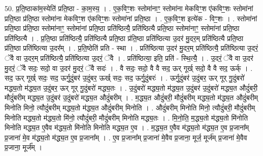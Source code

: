 \documentclass[17pt]{extarticle}
\begin{document}
50. प्र॒ति॒ष्ठाका॑म॒स्येति॑ प्रति॒ष्ठा - का॒म॒स्य॒ । . ए॒क॒विꣳ॒॒शः स्तोमा॑नाꣳ॒॒ स्तोमा॑ना मेकविꣳ॒॒श ए॑कविꣳ॒॒शः स्तोमा॑नां प्रति॒ष्ठा प्र॑ति॒ष्ठा स्तोमा॑ना मेकविꣳ॒॒श ए॑कविꣳ॒॒शः स्तोमा॑नां प्रति॒ष्ठा । . ए॒क॒विꣳ॒॒श इत्ये॑क - विꣳ॒॒शः । . स्तोमा॑नां प्रति॒ष्ठा प्र॑ति॒ष्ठा स्तोमा॑नाꣳ॒॒ स्तोमा॑नां प्रति॒ष्ठा प्रति॑ष्ठित्यै॒ प्रति॑ष्ठित्यै प्रति॒ष्ठा स्तोमा॑नाꣳ॒॒ स्तोमा॑नां प्रति॒ष्ठा प्रति॑ष्ठित्यै । . प्र॒ति॒ष्ठा प्रति॑ष्ठित्यै॒ प्रति॑ष्ठित्यै प्रति॒ष्ठा प्र॑ति॒ष्ठा प्रति॑ष्ठित्या उ॒दर॑ मु॒दर॒म् प्रति॑ष्ठित्यै प्रति॒ष्ठा प्र॑ति॒ष्ठा प्रति॑ष्ठित्या उ॒दर᳚म् । . प्र॒ति॒ष्ठेति॑ प्रति - स्था । . प्रति॑ष्ठित्या उ॒दर॑ मु॒दर॒म् प्रति॑ष्ठित्यै॒ प्रति॑ष्ठित्या उ॒दरं॒ ॅवै वा उ॒दर॒म् प्रति॑ष्ठित्यै॒ प्रति॑ष्ठित्या उ॒दरं॒ ॅवै । . प्रति॑ष्ठित्या॒ इति॒ प्रति॑ - स्थि॒त्यै॒ । . उ॒दरं॒ ॅवै वा उ॒दर॑ मु॒दरं॒ ॅवै सदः॒ सदो॒ वा उ॒दर॑ मु॒दरं॒ ॅवै सदः॑ । . वै सदः॒ सदो॒ वै वै सद॒ ऊर् गूर्ख् सदो॒ वै वै सद॒ ऊर्क् । . सद॒ ऊर् गूर्ख् सदः॒ सद॒ ऊर्गु॒दुंबर॑ उ॒दुंबर॒ ऊर्ख् सदः॒ सद॒ ऊर्गु॒दुंबरः॑ । . ऊर्गु॒दुंबर॑ उ॒दुंबर॒ ऊर् गूर् गु॒दुंबरो॑ मद्ध्य॒तो म॑द्ध्य॒त उ॒दुंबर॒ ऊर् गूर् गु॒दुंबरो॑ मद्ध्य॒तः । . उ॒दुंबरो॑ मद्ध्य॒तो म॑द्ध्य॒त उ॒दुंबर॑ उ॒दुंबरो॑ मद्ध्य॒त औदुं॑बरी॒ मौदुं॑बरीम् मद्ध्य॒त उ॒दुंबर॑ उ॒दुंबरो॑ मद्ध्य॒त औदुं॑बरीम् । . म॒द्ध्य॒त औदुं॑बरी॒ मौदुं॑बरीम् मद्ध्य॒तो म॑द्ध्य॒त औदुं॑बरीम् मिनोति मिनो॒ त्यौदुं॑बरीम् मद्ध्य॒तो म॑द्ध्य॒त औदुं॑बरीम् मिनोति । . औदुं॑बरीम् मिनोति मिनो॒ त्यौदुं॑बरी॒ मौदुं॑बरीम् मिनोति मद्ध्य॒तो म॑द्ध्य॒तो मि॑नो॒ त्यौदुं॑बरी॒ मौदुं॑बरीम् मिनोति मद्ध्य॒तः । . मि॒नो॒ति॒ म॒द्ध्य॒तो म॑द्ध्य॒तो मि॑नोति मिनोति मद्ध्य॒त ए॒वैव म॑द्ध्य॒तो मि॑नोति मिनोति मद्ध्य॒त ए॒व । . म॒द्ध्य॒त ए॒वैव म॑द्ध्य॒तो म॑द्ध्य॒त ए॒व प्र॒जाना᳚म् प्र॒जाना॑ मे॒व म॑द्ध्य॒तो म॑द्ध्य॒त ए॒व प्र॒जाना᳚म् । . ए॒व प्र॒जाना᳚म् प्र॒जाना॑ मे॒वैव प्र॒जाना॒ मूर्ज॒ मूर्ज॑म् प्र॒जाना॑ मे॒वैव प्र॒जाना॒ मूर्ज᳚म् । \newline
\end{document}
